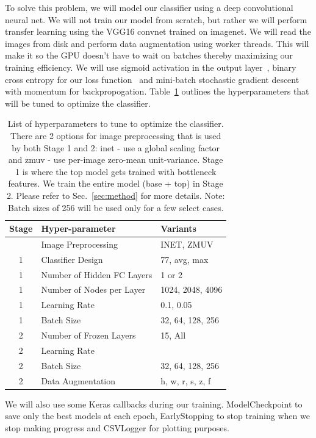 \documentclass[12pt,journal,compsoc]{IEEEtran}
\begin{document}

To solve this problem, we will model our classifier using a deep convolutional neural net. We will not train our model from scratch, but rather we will perform transfer learning using the VGG16 convnet trained on imagenet. We will read the images from disk and perform data augmentation using worker threads. This will make it so the GPU doesn't have to wait on batches thereby maximizing our training efficiency. We will use sigmoid activation in the output layer~\cite{Kurata:2016}, binary cross entropy for our loss function~\cite{deBoer2005} and mini-batch stochastic gradient descent with momentum for backpropogation. Table~\ref{tab:hyperparams} outlines the hyperparameters that will be tuned to optimize the classifier.
\begin{table}
\caption{List of hyperparameters to tune to optimize the classifier. There are 2 options for image preprocessing that is used by both Stage 1 and 2: inet - use a global scaling factor and zmuv - use per-image zero-mean unit-variance.  Stage 1 is where the top model gets trained with bottleneck features.
We train the entire model (base + top) in Stage 2.  Please refer to Sec.~\ref{sec:method} for more details. Note: Batch sizes of 256 will be used only for a few select cases.}
\label{tab:hyperparams}
\centering
\begin{tabular}{cll}
\toprule
Stage & Hyper-parameter & Variants \\
\midrule
 & Image Preprocessing & INET, ZMUV \\
\midrule
1 & Classifier Design & 77, avg, max \\
1 & Number of Hidden FC Layers & 1 or 2 \\
1 & Number of Nodes per Layer & 1024, 2048, 4096 \\
1 & Learning Rate & 0.1, 0.05\\
1 & Batch Size & 32, 64, 128, 256\\
\midrule
2 & Number of Frozen Layers & 15, All \\
2 & Learning Rate & \\
2 & Batch Size & 32, 64, 128, 256 \\
2 & Data Augmentation & h, w, r, s, z, f \\
\bottomrule
\end{tabular}
\end{table}
We will also use some Keras callbacks during our training.  ModelCheckpoint to save only the best models at each epoch, EarlyStopping to stop training when we stop making progress and CSVLogger for plotting purposes.
\end{document}
